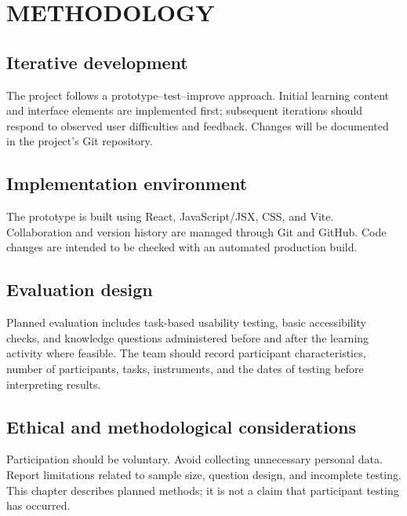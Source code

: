 \chapter{METHODOLOGY}
\section{Iterative development}
The project follows a prototype--test--improve approach. Initial learning content and interface elements are implemented first; subsequent iterations should respond to observed user difficulties and feedback. Changes will be documented in the project's Git repository.

\section{Implementation environment}
The prototype is built using React, JavaScript/JSX, CSS, and Vite. Collaboration and version history are managed through Git and GitHub. Code changes are intended to be checked with an automated production build.

\section{Evaluation design}
Planned evaluation includes task-based usability testing, basic accessibility checks, and knowledge questions administered before and after the learning activity where feasible. The team should record participant characteristics, number of participants, tasks, instruments, and the dates of testing before interpreting results.

\section{Ethical and methodological considerations}
Participation should be voluntary. Avoid collecting unnecessary personal data. Report limitations related to sample size, question design, and incomplete testing. This chapter describes planned methods; it is not a claim that participant testing has occurred.
